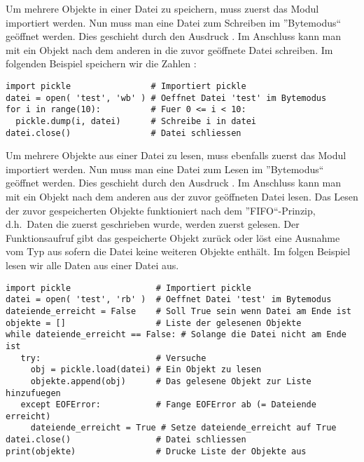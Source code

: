 Um mehrere Objekte in einer Datei zu speichern, muss zuerst das Modul  importiert werden.
Nun muss man eine Datei  zum Schreiben im ''Bytemodus`` geöffnet werden.
Dies geschieht durch den Ausdruck .
Im Anschluss kann man mit  ein Objekt nach dem anderen in die zuvor geöffnete Datei  schreiben.
Im folgenden Beispiel speichern wir die Zahlen :
\begin{lstlisting}
import pickle                # Importiert pickle
datei = open( 'test', 'wb' ) # Oeffnet Datei 'test' im Bytemodus
for i in range(10):          # Fuer 0 <= i < 10:
  pickle.dump(i, datei)      # Schreibe i in datei
datei.close()                # Datei schliessen
\end{lstlisting}

Um mehrere Objekte aus einer Datei zu lesen, muss ebenfalls zuerst das Modul  importiert werden.
Nun muss man eine Datei  zum Lesen im ''Bytemodus`` geöffnet werden.
Dies geschieht durch den Ausdruck .
Im Anschluss kann man mit  ein Objekt nach dem anderen aus der zuvor geöffneten Datei  lesen.
Das Lesen der zuvor gespeicherten Objekte funktioniert nach dem ''FIFO``-Prinzip, d.h.\ Daten die zuerst geschrieben wurde, werden zuerst gelesen.
Der Funktionsaufruf  gibt das gespeicherte Objekt zurück oder löst eine Ausnahme vom Typ  aus sofern die Datei keine weiteren Objekte enthält.
Im folgen Beispiel lesen wir alle Daten aus einer Datei aus.
\begin{lstlisting}
import pickle                 # Importiert pickle
datei = open( 'test', 'rb' )  # Oeffnet Datei 'test' im Bytemodus
dateiende_erreicht = False    # Soll True sein wenn Datei am Ende ist
objekte = []                  # Liste der gelesenen Objekte
while dateiende_erreicht == False: # Solange die Datei nicht am Ende ist
   try:                       # Versuche
     obj = pickle.load(datei) # Ein Objekt zu lesen
     objekte.append(obj)      # Das gelesene Objekt zur Liste hinzufuegen
   except EOFError:           # Fange EOFError ab (= Dateiende erreicht)
     dateiende_erreicht = True # Setze dateiende_erreicht auf True
datei.close()                 # Datei schliessen
print(objekte)                # Drucke Liste der Objekte aus
\end{lstlisting}


